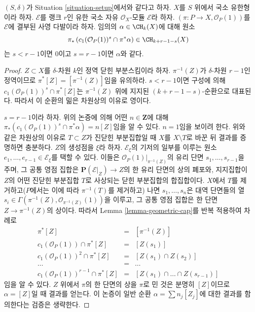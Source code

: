 \begin{lemma}
\label{lemma-cap-projective-bundle}
$(S, \delta)$가 Situation \ref{situation-setup}에서와 같다고 하자.
$X$를 $S$ 위에서 국소 유한형이라 하자. $\mathcal{E}$를 랭크 $r$인
유한 국소 자유 $\mathcal{O}_X$-모듈 $\mathcal{E}$라 하자.
$(\pi : P \to X, \mathcal{O}_P(1))$를 $\mathcal{E}$에 결부된 사영
다발이라 하자. 임의의 $\alpha \in \CH_k(X)$에 대해 원소
$$
\pi_*\left(
c_1(\mathcal{O}_P(1))^s \cap \pi^*\alpha
\right)
\in
\CH_{k + r - 1 - s}(X)
$$
는 $s < r - 1$이면 $0$이고 $s = r - 1$이면 $\alpha$와 같다.
\end{lemma}

\begin{proof}
$Z \subset X$를 $\delta$-차원 $k$인 정역 닫힌 부분스킴이라 하자.
$\pi^{-1}(Z)$가 $\delta$-차원 $r - 1$인 정역이므로
$\pi^*[Z] = [\pi^{-1}(Z)]$임을 유의하라. $s < r - 1$이면 구성에 의해
$c_1(\mathcal{O}_P(1))^s \cap \pi^*[Z]$는 $\pi^{-1}(Z)$ 위에 지지된
$(k + r - 1 - s)$-순환으로 대표된다. 따라서 이 순환의 밂은 차원상의
이유로 영이다.

\medskip\noindent
$s = r - 1$이라 하자. 위의 논증에 의해 어떤 $n \in \mathbf{Z}$에 대해
$\pi_*(c_1(\mathcal{O}_P(1))^s \cap \pi^*\alpha) = n [Z]$임을 알 수
있다. $n = 1$임을 보이려 한다. 위와 같은 차원상의 이유로
$T \subset Z$가 진닫힌 부분집합일 때 $X$를 $X \setminus T$로 바꾼 뒤
결과를 증명하면 충분하다. $Z$의 생성점을 $\xi$라 하자.
$\mathcal{E}_\xi$의 기저의 일부를 이루는 원소
$e_1, \ldots, e_{r - 1} \in \mathcal{E}_\xi$를 택할 수 있다. 이들은
$\mathcal{O}_P(1)|_{\pi^{-1}(Z)}$의 유리 단면
$s_1, \ldots, s_{r - 1}$을 주며, 그 공통 영점 집합은
$\mathbf{P}(\mathcal{E}|_Z) \to Z$의 한 유리 단면의 상의
폐포와, 지지집합이 $Z$의 어떤 진닫힌 부분집합 $T$로 사상되는 닫힌
부분집합의 합집합이다.
$X$에서 $T$를 제거하고($P$에서는 이에 따라 $\pi^{-1}(T)$를 제거하고)
나면 $s_1, \ldots, s_n$은 대역 단면들의 열
$s_i \in \Gamma(\pi^{-1}(Z), \mathcal{O}_{\pi^{-1}(Z)}(1))$을 이루고,
그 공통 영점 집합은 한 단면 $Z \to \pi^{-1}(Z)$의 상이다. 따라서
Lemma \ref{lemma-geometric-cap}를 반복 적용하여 차례로
\begin{eqnarray*}
\pi^*[Z] & = & [\pi^{-1}(Z)] \\
c_1(\mathcal{O}_P(1)) \cap \pi^*[Z] & = & [Z(s_1)] \\
c_1(\mathcal{O}_P(1))^2 \cap \pi^*[Z] & = & [Z(s_1) \cap Z(s_2)] \\
\ldots & = & \ldots \\
c_1(\mathcal{O}_P(1))^{r - 1} \cap \pi^*[Z] & = &
[Z(s_1) \cap \ldots \cap Z(s_{r - 1})]
\end{eqnarray*}
임을 알 수 있다. $Z$ 위에서 $\pi$의 한 단면의 상을 $\pi$로 민 것은
분명히 $[Z]$이므로 $\alpha = [Z]$일 때 결과를 얻는다. 이 논증이 일반
순환 $\alpha = \sum n_j [Z_j]$에 대한 결과를 함의한다는 검증은
생략한다.
\end{proof}


